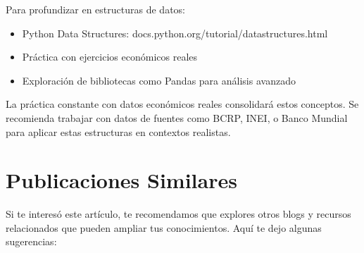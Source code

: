 \documentclass[
  doc,
  floatsintext,
  longtable,
  a4paper,
  nolmodern,
  notxfonts,
  notimes,
  12pt,
  colorlinks=true,linkcolor=blue,citecolor=blue,urlcolor=blue]{apa7}
\providecommand{\tightlist}{%
  \setlength{\itemsep}{0pt}\setlength{\parskip}{0pt}}
\begin{document}
Para profundizar en estructuras de datos:

\begin{itemize}
\tightlist
\item
  Python Data Structures: docs.python.org/tutorial/datastructures.html
\item
  Práctica con ejercicios económicos reales
\item
  Exploración de bibliotecas como Pandas para análisis avanzado
\end{itemize}

La práctica constante con datos económicos reales consolidará estos
conceptos. Se recomienda trabajar con datos de fuentes como BCRP, INEI,
o Banco Mundial para aplicar estas estructuras en contextos realistas.

\section{Publicaciones Similares}\label{publicaciones-similares}

Si te interesó este artículo, te recomendamos que explores otros blogs y
recursos relacionados que pueden ampliar tus conocimientos. Aquí te dejo
algunas sugerencias:
\end{document}
